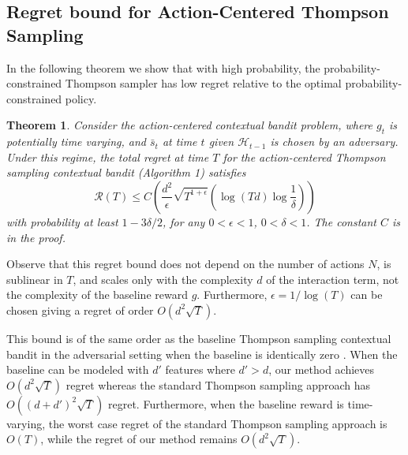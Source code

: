 \documentclass{article}
\newtheorem{theorem}{Theorem}
\begin{document}
\subsection{Regret bound for Action-Centered Thompson Sampling}
In the following theorem we show that with high probability, the probability-constrained Thompson sampler has low regret relative to the optimal probability-constrained policy. 
\begin{theorem}
Consider the action-centered contextual bandit problem, where $g_t$ is potentially time varying, and $\bar{s}_t$ at time $t$ given $\mathcal{H}_{t-1}$ is chosen by an adversary. Under this regime, the total regret at time $T$ for the action-centered Thompson sampling contextual bandit (Algorithm 1) satisfies
\[
\mathcal{R}(T) \leq C \left(\frac{d^2}{\epsilon} \sqrt{T^{1+\epsilon}}(\log(Td) \log \frac{1}{\delta})\right)
\]
with probability at least $1-3\delta/2$, for any $0< \epsilon < 1$, $0< \delta < 1$. The constant $C$ is in the proof.
\end{theorem}
Observe that this regret bound does not depend on the number of actions $N$, is sublinear in $T$, and scales only with the complexity $d$ of the interaction term, not the complexity of the baseline reward $g$. Furthermore, $\epsilon = 1/\log(T)$ can be chosen giving a regret of order $O(d^2 \sqrt{T})$. 

This bound is of the same order as the baseline Thompson sampling contextual bandit in the adversarial setting when the baseline is identically zero \citep{agrawal2013thompson}. When the baseline can be modeled with $d'$ features where $d' > d$, our method achieves $O(d^2\sqrt{T})$ regret whereas the standard Thompson sampling approach has $O((d + d')^2 \sqrt{T})$ regret. Furthermore, when the baseline reward is time-varying, the worst case regret of the standard Thompson sampling approach is $O(T)$, while the regret of our method remains $O(d^2 \sqrt{T})$.











\end{document}
